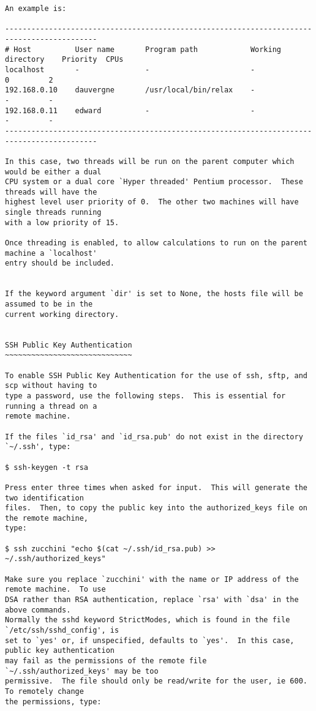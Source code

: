 {\begin{verbatim}
An example is:

-------------------------------------------------------------------------------------------
# Host          User name       Program path            Working directory    Priority  CPUs
localhost       -               -                       -                    0         2
192.168.0.10    dauvergne       /usr/local/bin/relax    -                    -         -
192.168.0.11    edward          -                       -                    -         -
-------------------------------------------------------------------------------------------

In this case, two threads will be run on the parent computer which would be either a dual
CPU system or a dual core `Hyper threaded' Pentium processor.  These threads will have the
highest level user priority of 0.  The other two machines will have single threads running
with a low priority of 15.

Once threading is enabled, to allow calculations to run on the parent machine a `localhost'
entry should be included.


If the keyword argument `dir' is set to None, the hosts file will be assumed to be in the
current working directory.


SSH Public Key Authentication
~~~~~~~~~~~~~~~~~~~~~~~~~~~~~

To enable SSH Public Key Authentication for the use of ssh, sftp, and scp without having to
type a password, use the following steps.  This is essential for running a thread on a
remote machine.

If the files `id_rsa' and `id_rsa.pub' do not exist in the directory `~/.ssh', type:

$ ssh-keygen -t rsa

Press enter three times when asked for input.  This will generate the two identification
files.  Then, to copy the public key into the authorized_keys file on the remote machine,
type:

$ ssh zucchini "echo $(cat ~/.ssh/id_rsa.pub) >> ~/.ssh/authorized_keys"

Make sure you replace `zucchini' with the name or IP address of the remote machine.  To use
DSA rather than RSA authentication, replace `rsa' with `dsa' in the above commands.
Normally the sshd keyword StrictModes, which is found in the file `/etc/ssh/sshd_config', is
set to `yes' or, if unspecified, defaults to `yes'.  In this case, public key authentication
may fail as the permissions of the remote file `~/.ssh/authorized_keys' may be too
permissive.  The file should only be read/write for the user, ie 600.  To remotely change
the permissions, type:


\end{verbatim}}
